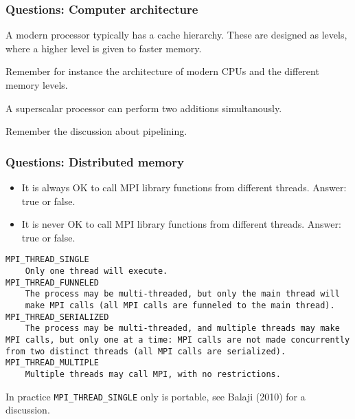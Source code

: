 \begin{frame}[fragile]
  \frametitle{Questions: Computer architecture}

\begin{ex}[2014]
A modern processor typically has a cache hierarchy. These are designed as
levels, where a higher level is given to faster memory.
\end{ex}

Remember for instance the architecture of modern CPUs and the different memory levels. 

\begin{ex}[2014]
A superscalar processor can perform two additions simultanously.
\end{ex}

Remember the discussion about pipelining.

\end{frame}

\begin{frame}[fragile]
  \frametitle{Questions: Distributed memory}

\begin{ex}[2016]
\begin{itemize}
\item It is always OK to call MPI library functions from different threads. Answer:
true or false.
\item It is never OK to call MPI library functions from different threads. Answer:
true or false.
\end{itemize}
\end{ex}

{\scriptsize
\begin{lstlisting}[style=c]
MPI_THREAD_SINGLE
    Only one thread will execute. 
MPI_THREAD_FUNNELED
    The process may be multi-threaded, but only the main thread will
    make MPI calls (all MPI calls are funneled to the main thread). 
MPI_THREAD_SERIALIZED
    The process may be multi-threaded, and multiple threads may make MPI calls, but only one at a time: MPI calls are not made concurrently from two distinct threads (all MPI calls are serialized). 
MPI_THREAD_MULTIPLE
    Multiple threads may call MPI, with no restrictions. 
\end{lstlisting}
}

In practice \texttt{MPI\_THREAD\_SINGLE} only is portable, see Balaji (2010) for a discussion.

\end{frame}

